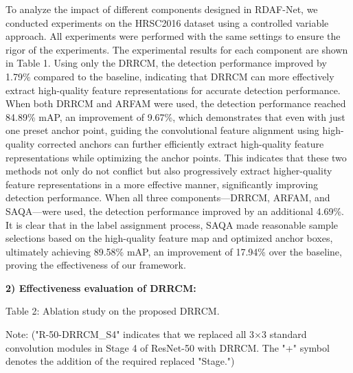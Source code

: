 \documentclass[journal]{IEEEtran}
\begin{document}
To analyze the impact of different components designed in RDAF-Net, we conducted experiments on the HRSC2016 dataset using a controlled variable approach. All experiments were performed with the same settings to ensure the rigor of the experiments. The experimental results for each component are shown in Table 1. Using only the DRRCM, the detection performance improved by 1.79\% compared to the baseline, indicating that DRRCM can more effectively extract high-quality feature representations for accurate detection performance. When both DRRCM and ARFAM were used, the detection performance reached 84.89\% mAP, an improvement of 9.67\%, which demonstrates that even with just one preset anchor point, guiding the convolutional feature alignment using high-quality corrected anchors can further efficiently extract high-quality feature representations while optimizing the anchor points. This indicates that these two methods not only do not conflict but also progressively extract higher-quality feature representations in a more effective manner, significantly improving detection performance. When all three components—DRRCM, ARFAM, and SAQA—were used, the detection performance improved by an additional 4.69\%. It is clear that in the label assignment process, SAQA made reasonable sample selections based on the high-quality feature map and optimized anchor boxes, ultimately achieving 89.58\% mAP, an improvement of 17.94\% over the baseline, proving the effectiveness of our framework.

\textbf{2) Effectiveness evaluation of DRRCM:}

Table 2: Ablation study on the proposed DRRCM.

Note: ("R-50-DRRCM\_S4" indicates that we replaced all 3×3 standard convolution modules in Stage 4 of ResNet-50 with DRRCM. The "+" symbol denotes the addition of the required replaced "Stage.")
\end{document}
